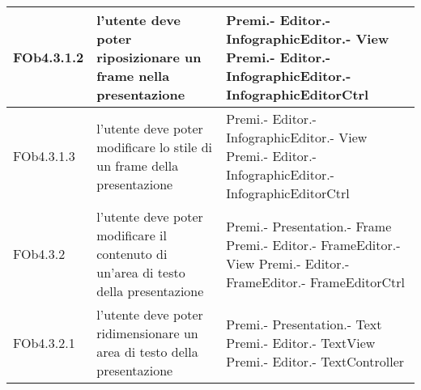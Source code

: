 \begin{longtable}{|l|p{5cm}|p{7cm}|}
\hline
FOb4.3.1.2 & l'utente deve poter riposizionare un frame nella presentazione & Premi.- \linebreak Editor.- \linebreak InfographicEditor.- \linebreak View \linebreak Premi.- \linebreak Editor.- \linebreak InfographicEditor.- \linebreak InfographicEditorCtrl \linebreak \\
\hline
FOb4.3.1.3 & l'utente deve poter modificare lo stile di un frame della presentazione & Premi.- \linebreak Editor.- \linebreak InfographicEditor.- \linebreak View \linebreak Premi.- \linebreak Editor.- \linebreak InfographicEditor.- \linebreak InfographicEditorCtrl \linebreak \\
\hline
FOb4.3.2 & l'utente deve poter modificare il contenuto di un'area di testo della presentazione & Premi.- \linebreak Presentation.- \linebreak Frame \linebreak Premi.- \linebreak Editor.- \linebreak FrameEditor.- \linebreak View \linebreak Premi.- \linebreak Editor.- \linebreak FrameEditor.- \linebreak FrameEditorCtrl \linebreak \\
\hline
FOb4.3.2.1 & l'utente deve poter ridimensionare un area di testo della presentazione & Premi.- \linebreak Presentation.- \linebreak Text \linebreak Premi.- \linebreak Editor.- \linebreak TextView \linebreak Premi.- \linebreak Editor.- \linebreak TextController \linebreak \\

\end{longtable}
